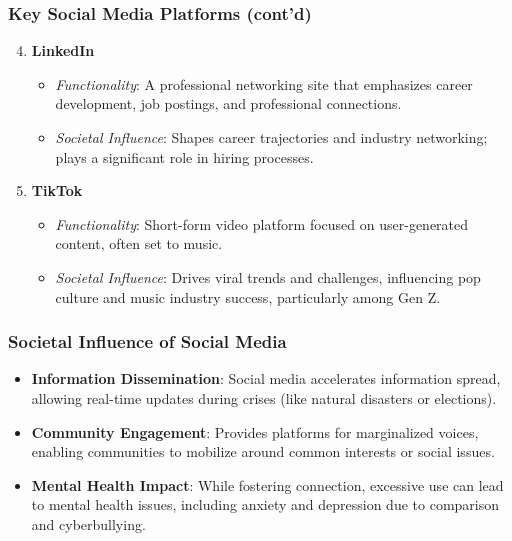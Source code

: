 \documentclass{beamer}
\begin{document}
\begin{frame}[fragile]
    \frametitle{Key Social Media Platforms (cont'd)}
    \begin{enumerate}\setcounter{enumi}{3}
        \item \textbf{LinkedIn}
            \begin{itemize}
                \item \textit{Functionality}: A professional networking site that emphasizes career development, job postings, and professional connections.
                \item \textit{Societal Influence}: Shapes career trajectories and industry networking; plays a significant role in hiring processes.
            \end{itemize}
        
        \item \textbf{TikTok}
            \begin{itemize}
                \item \textit{Functionality}: Short-form video platform focused on user-generated content, often set to music.
                \item \textit{Societal Influence}: Drives viral trends and challenges, influencing pop culture and music industry success, particularly among Gen Z.
            \end{itemize}
    \end{enumerate}
\end{frame}

\begin{frame}[fragile]
    \frametitle{Societal Influence of Social Media}
    \begin{itemize}
        \item \textbf{Information Dissemination}: Social media accelerates information spread, allowing real-time updates during crises (like natural disasters or elections).
        \item \textbf{Community Engagement}: Provides platforms for marginalized voices, enabling communities to mobilize around common interests or social issues.
        \item \textbf{Mental Health Impact}: While fostering connection, excessive use can lead to mental health issues, including anxiety and depression due to comparison and cyberbullying.
    \end{itemize}
\end{frame}
\end{document}

